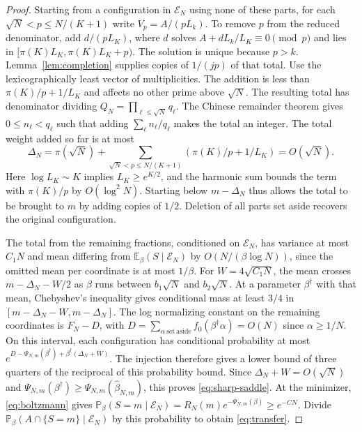 \documentclass[11pt]{amsart}
\theoremstyle{remark}
\newcommand{\Pp}{\mathbb P}
\newcommand{\Ee}{\mathbb E}
\begin{document}
\begin{proof}
Starting from a configuration in \(\mathcal E_N\) using none of these parts,
for each \(\sqrt N<p\le N/(K+1)\) write \(V_p=A/(pL_k)\).
To remove \(p\) from the reduced denominator, add \(d/(pL_K)\), where
\(d\) solves \(A+dL_k/L_K\equiv0\pmod p\) and lies in
\([\pi(K)L_K,\pi(K)L_K+p)\). The solution is unique because \(p>k\).
Lemma~\ref{lem:completion} supplies copies of \(1/(jp)\) of that total.
Use the lexicographically least vector of multiplicities.
The addition is less than \(\pi(K)/p+1/L_K\) and affects no other
prime above \(\sqrt N\). The resulting total has denominator dividing
\(Q_N=\prod_{\ell\le\sqrt N}q_\ell\). The Chinese remainder theorem
gives \(0\le n_\ell<q_\ell\) such that adding \(\sum_\ell n_\ell/q_\ell\)
makes the total an integer. The total weight added so far is at most
\[
 \Delta_N=\pi(\sqrt N)+\sum_{\sqrt N<p\le N/(K+1)}
         \left(\pi(K)/p+1/L_K\right)=O(\sqrt N).
\]
Here \(\log L_K\sim K\) implies \(L_K\ge e^{K/2}\), and the harmonic
sum bounds the term with \(\pi(K)/p\) by \(O(\log^2 N)\).
Starting below \(m-\Delta_N\) thus allows the total to be brought
to \(m\) by adding copies of \(1/2\). Deletion of all parts set aside
recovers the original configuration.

The total from the remaining fractions, conditioned on \(\mathcal E_N\),
has variance at most \(C_1N\) and mean differing from
\(\Ee_\beta(S\mid\mathcal E_N)\) by \(O(N/(\beta\log N))\), since
the omitted mean per coordinate is at most \(1/\beta\).
For \(W=4\sqrt{C_1N}\), the mean crosses \(m-\Delta_N-W/2\) as
\(\beta\) runs between \(b_1\sqrt N\) and \(b_2\sqrt N\).
At a parameter \(\beta^\dagger\) with that mean, Chebyshev's inequality
gives conditional mass at least \(3/4\) in
\([m-\Delta_N-W,m-\Delta_N]\).
The log normalizing constant on the remaining coordinates is
\(F_N-D\), with \(D=\sum_{\alpha\ \mathrm{set\ aside}}f_0(\beta^\dagger\alpha)
=O(N)\) since \(\alpha\ge1/N\).
On this interval, each configuration has conditional probability
at most \(e^{D-\Psi_{N,m}(\beta^\dagger)+\beta^\dagger(\Delta_N+W)}\).
The injection therefore gives a lower bound of three quarters of the
reciprocal of this probability bound. Since \(\Delta_N+W=O(\sqrt N)\)
and \(\Psi_{N,m}(\beta^\dagger)\ge\Psi_{N,m}(\widehat\beta_{N,m})\),
this proves \eqref{eq:sharp-saddle}.
At the minimizer, \eqref{eq:boltzmann} gives
\(\Pp_\beta(S=m\mid\mathcal E_N)=R_N(m)e^{-\Psi_{N,m}(\beta)}
\ge e^{-CN}\). Divide \(\Pp_\beta(A\cap\{S=m\}\mid\mathcal E_N)\)
by this probability to obtain \eqref{eq:transfer}.
\end{proof}
\end{document}
